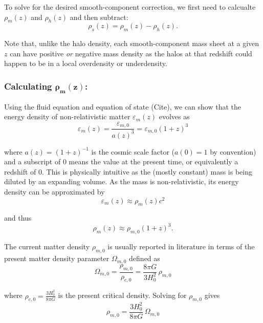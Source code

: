 \documentclass[%
 reprint,
 amsmath,amssymb,
 aps,nofootinbib
]{revtex4-1}
\begin{document}
To solve for the desired smooth-component correction, we first need to calcualte ${\rho_m(z)}$ and ${\rho_h(z)}$ and then subtract:
\begin{equation}\label{smooth_correction2}
\rho_s(z)=\rho_m(z)-\rho_h(z).
\end{equation}

\noindent Note that, unlike the halo density, each smooth-component mass sheet at a given $z$ can have positive \textit{or} negative mass density as the halos at that redshift could happen to be in a local overdensity or underdensity.

\subsubsection{Calculating $\mathbf{\rho_m(z)}$:}

Using the fluid equation and equation of state (Cite), we can show that the energy density of non-relativistic matter $\varepsilon_m(z)$ evolves as
\begin{equation}\label{energy_evol}
\varepsilon_m(z)=\frac{\varepsilon_{m,0}}{a(z)^3}=\varepsilon_{m,0}(1+z)^3
\end{equation}

\noindent where $a(z)=(1+z)^{-1}$ is the cosmic scale factor (${a(0)=1}$ by convention) and a subscript of 0 means the value at the present time, or equivalently a redshift of 0. This is physically intuitive as the (mostly constant) mass is being diluted by an expanding volume. As the mass is non-relativistic, its energy density can be approximated by
\begin{equation*}\label{energy_mass}
\varepsilon_m(z)\approx\rho_m(z)c^2
\end{equation*}

\noindent and thus
\begin{equation}\label{mass_evol}
\rho_m(z)\approx\rho_{m,0}(1+z)^3.
\end{equation}

The current matter density $\rho_{m,0}$ is usually reported in literature in terms of the present matter density parameter $\Omega_{m,0}$ defined as
\begin{equation}\label{}
\Omega_{m,0}=\frac{\rho_{m,0}}{\rho_{c,0}}=\frac{8\pi G}{3H_0^2}\,\rho_{m,0}
\end{equation}

\noindent where $\rho_{c,0}=\frac{3H_0^2}{8\pi G}$ is the present critical density. Solving for $\rho_{m,0}$ gives
\begin{equation*}\label{}
\rho_{m,0}=\frac{3H_0^2}{8\pi G}\,\Omega_{m,0}
\end{equation*}
\end{document}
